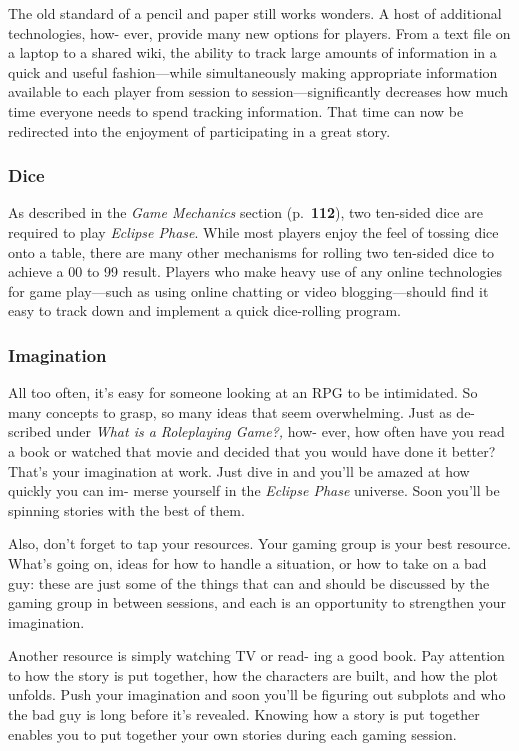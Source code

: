 The old standard of a pencil and paper still works 
wonders. A host of additional technologies, how-
ever, provide many new options for players. From 
a text file on a laptop to a shared wiki, the ability 
to track large amounts of information in a quick 
and useful fashion—while simultaneously making 
appropriate information available to each player 
from session to session—significantly decreases 
how much time everyone needs to spend tracking 
information. That time can now be redirected into 
the enjoyment of participating in a great story.

\subsubsection{Dice}

As described in the \textit{Game Mechanics} section (p. \textbf{112}), 
two ten-sided dice are required to play \textit{Eclipse Phase}. 
While most players enjoy the feel of tossing dice onto 
a table, there are many other mechanisms for rolling 
two ten-sided dice to achieve a 00 to 99 result. Players 
who make heavy use of any online technologies for 
game play—such as using online chatting or video 
blogging—should find it easy to track down and 
implement a quick dice-rolling program.

\subsubsection{Imagination}

All too often, it's easy for someone looking at an 
RPG to be intimidated. So many concepts to grasp, 
so many ideas that seem overwhelming. Just as de-
scribed under \textit{What is a Roleplaying Game?,} how-
ever, how often have you read a book or watched 
that movie and decided that you would have done 
it better? That's your imagination at work. Just dive 
in and you'll be amazed at how quickly you can im-
merse yourself in the \textit{Eclipse Phase} universe. Soon 
you'll be spinning stories with the best of them.

Also, don't forget to tap your resources. Your 
gaming group is your best resource. What's going on, 
ideas for how to handle a situation, or how to take 
on a bad guy: these are just some of the things that 
can and should be discussed by the gaming group 
in between sessions, and each is an opportunity to 
strengthen your imagination.

Another resource is simply watching TV or read-
ing a good book. Pay attention to how the story is 
put together, how the characters are built, and how 
the plot unfolds. Push your imagination and soon 
you'll be figuring out subplots and who the bad guy 
is long before it's revealed. Knowing how a story is 
put together enables you to put together your own 
stories during each gaming session.

